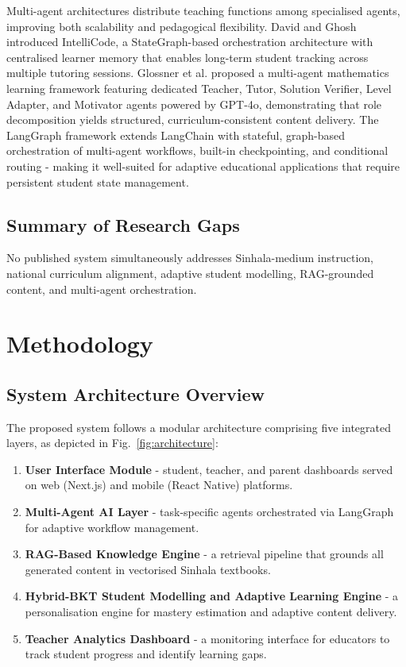 \documentclass[conference]{IEEEtran}
\begin{document}
Multi-agent architectures distribute teaching functions among specialised agents, improving both scalability and pedagogical flexibility. David and Ghosh \cite{b30} introduced IntelliCode, a StateGraph-based orchestration architecture with centralised learner memory that enables long-term student tracking across multiple tutoring sessions. Glossner et al. \cite{b31} proposed a multi-agent mathematics learning framework featuring dedicated Teacher, Tutor, Solution Verifier, Level Adapter, and Motivator agents powered by GPT-4o, demonstrating that role decomposition yields structured, curriculum-consistent content delivery. The LangGraph framework \cite{b32} extends LangChain with stateful, graph-based orchestration of multi-agent workflows, built-in checkpointing, and conditional routing - making it well-suited for adaptive educational applications that require persistent student state management.

\subsection{Summary of Research Gaps}

No published system simultaneously addresses Sinhala-medium instruction, national curriculum alignment, adaptive student modelling, RAG-grounded content, and multi-agent orchestration.

\section{Methodology}

\subsection{System Architecture Overview}

The proposed system follows a modular architecture comprising five integrated layers, as depicted in Fig.~\ref{fig:architecture}:

\begin{enumerate}
\item \textbf{User Interface Module} - student, teacher, and parent dashboards served on web (Next.js) and mobile (React Native) platforms.
\item \textbf{Multi-Agent AI Layer} - task-specific agents orchestrated via LangGraph for adaptive workflow management.
\item \textbf{RAG-Based Knowledge Engine} - a retrieval pipeline that grounds all generated content in vectorised Sinhala textbooks.
\item \textbf{Hybrid-BKT Student Modelling and Adaptive Learning Engine} - a personalisation engine for mastery estimation and adaptive content delivery.
\item \textbf{Teacher Analytics Dashboard} - a monitoring interface for educators to track student progress and identify learning gaps.
\end{enumerate}
\end{document}
